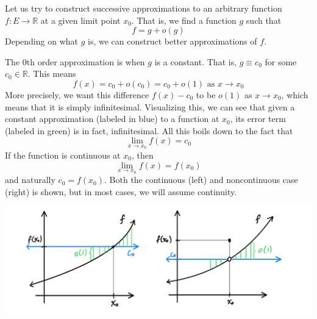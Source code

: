   Let us try to construct successive approximations to an arbitrary function $f: E \longrightarrow \mathbb{R}$ at a given limit point $x_0$. That is, we find a function $g$ such that
  \[f = g + o(g)\]
  Depending on what $g$ is, we can construct better approximations of $f$. 

  \begin{example}
    The 0th order approximation is when $g$ is a constant. That is, $g \equiv c_0$ for some $c_0 \in \mathbb{R}$. This means
    \begin{equation}
      f(x) = c_0 + o(c_0) = c_0 + o(1) \text{ as } x \rightarrow x_0
    \end{equation}
    More precisely, we want this difference $f(x) - c_0$ to be $o(1)$ as $x \rightarrow x_0$, which means that it is simply infinitesimal. Visualizing this, we can see that given a constant approximation (labeled in blue) to a function at $x_0$, its error term (labeled in green) is in fact, infinitesimal. All this boils down to the fact that 
    \[\lim_{x \rightarrow x_0} f(x) = c_0\]
    If the function is continuous at $x_0$, then 
    \[\lim_{x \rightarrow x_0} f(x) = f(x_0)\]
    and naturally $c_0 = f(x_0)$. Both the continuous (left) and noncontinuous case (right) is shown, but in most cases, we will assume continuity. 
    \begin{center}
      \includegraphics[scale=0.25]{img/Constant_Approximation_Continuous_Noncontinuous_case.PNG}
    \end{center}
  \end{example}

